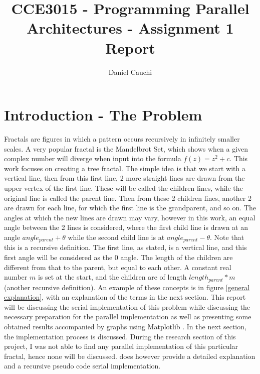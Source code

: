 \documentclass[11pt]{article}
\begin{document}
\title{CCE3015 - Programming Parallel Architectures - Assignment 1 Report}
\author{Daniel Cauchi}
\date{}
\maketitle

\section{Introduction - The Problem} \label{intro}
Fractals are figures in which a pattern occurs recursively in infinitely smaller scales. A very popular fractal is the Mandelbrot Set, which shows when a given complex number will diverge when input into the formula $f(z) = z^2 + c$. This work focuses on creating a tree fractal. The simple idea is that we start with a vertical line, then from this first line, 2 more straight lines are drawn from the upper vertex of the first line. These will be called the children lines, while the original line is called the parent line. Then from these 2 children lines, another 2 are drawn for each line, for which the first line is the grandparent, and so on. The angles at which the new lines are drawn may vary, however in this work, an equal angle between the 2 lines is considered, where the first child line is drawn at an angle $angle_{parent} + \theta$ while the second child line is at $angle_{parent} - \theta$. Note that this is a recursive definition. The first line, as stated, is a vertical line, and this first angle will be considered as the 0 angle. The length of the children are different from that to the parent, but equal to each other. A constant real number $m$ is set at the start, and the children are of length $length_{parent} * m$ (another recursive definition). An example of these concepts is in figure \ref{general explanation}, with an explanation of the terms in the next section. This report will be discussing the serial implementation of this problem while discussing the necessary preparation for the parallel implementation as well as presenting some obtained results accompanied by graphs using Matplotlib \cite{matplotlib}. In the next section, the implementation process is discussed. During the research section of this project, I was not able to find any parallel implementation of this particular fractal, hence none will be discussed. \cite{natureofcode} does however provide a detailed explanation and a recursive pseudo code serial implementation.
\end{document}
